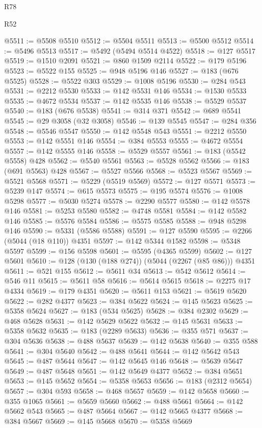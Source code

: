 \begin{lexlean}{R78}
\begin{lexlean}{R52}
\begin{coremodule}
{{{{{{{{{{{{{{{{{{{{{{{{{{{{{{{{{{{{{{{{{{{{{{{{{{{{{{{{{{{{{{{{{{{{{{{{{{{{{{{{{{{{{{{{{{{{{{{{{{{{{{{{{{{{{{{{{{{{{{{{{{{{{{{{{{{{{{{{{{{{{{{{{{{{{{{{{{{{{{{{{{{{{{{{{{{{{{{{{{{{{{{{{{{{{{{{{{{{{{@5511 := @5508 @5510
@5512 := @5504 @5511
@5513 := @5500 @5512
@5514 := @5496 @5513
@5517 := @5492 (@5494 @5514 @4522)
@5518 := @127 @5517
@5519 := @1510 @2091
@5521 := @860 @1509 @2114
@5522 := @179 @5196
@5523 := @5522 @155
@5525 := @948 @5196 @146
@5527 := @183 (@676 @5525)
@5528 := @5522 @303
@5529 := @1008 @5196
@5530 := @284 @543
@5531 := @2212 @5530
@5533 := @142 @5531 @146
@5534 := @1530 @5533
@5535 := @4672 @5534
@5537 := @142 @5535 @146
@5538 := @5529 @5537
@5540 := @183 (@676 @5538)
@5541 := @314 @371
@5542 := @689 @5541
@5545 := @29 @3058 (@32 @3058)
@5546 := @139 @5545
@5547 := @284 @356
@5548 := @5546 @5547
@5550 := @142 @5548 @543
@5551 := @2212 @5550
@5553 := @142 @5551 @146
@5554 := @384 @5553
@5555 := @4672 @5554
@5557 := @142 @5555 @146
@5558 := @5529 @5557
@5561 := @183 (@5542 @5558) @428
@5562 := @5540 @5561
@5563 := @5528 @5562
@5566 := @183 (@691 @5563) @428
@5567 := @5527 @5566
@5568 := @5523 @5567
@5569 := @5521 @5568
@5571 := @5229 (@5519 @5569)
@5572 := @127 @5571
@5573 := @5239 @147
@5574 := @615 @5573
@5575 := @195 @5574
@5576 := @1008 @5298
@5577 := @5030 @5274
@5578 := @2290 @5577
@5580 := @142 @5578 @146
@5581 := @5253 @5580
@5582 := @4748 @5581
@5584 := @142 @5582 @146
@5585 := @5576 @5584
@5586 := @5575 @5585
@5588 := @948 @5298 @146
@5590 := @5331 (@5586 @5588)
@5591 := @127 @5590
@5595 := @2266 (@5044 (@18 @110)) @4351
@5597 := @142 @5344 @1582
@5598 := @5348 @5597
@5599 := @156 @5598
@5601 := @5595 (@4365 @5599)
@5602 := @127 @5601
@5610 := @128 (@130 (@188 @274)) (@5044 (@2267 (@85 @86))) @4351
@5611 := @521 @155
@5612 := @5611 @34
@5613 := @542 @5612
@5614 := @546 @11
@5615 := @5611 @58
@5616 := @5614 @5615
@5618 := @2275 @17 @4334
@5619 := @179 @4351
@5620 := @5611 @153
@5621 := @5619 @5620
@5622 := @282 @4377
@5623 := @384 @5622
@5624 := @145 @5623
@5625 := @5358 @5624
@5627 := @183 (@534 @5625)
@5628 := @384 @2302
@5629 := @468 @5628
@5631 := @142 @5629 @5622
@5632 := @145 @5631
@5633 := @5358 @5632
@5635 := @183 (@2289 @5633)
@5636 := @355 @571
@5637 := @304 @5636
@5638 := @488 @5637
@5639 := @142 @5638
@5640 := @355 @588
@5641 := @304 @5640
@5642 := @488 @5641
@5644 := @142 @5642 @543
@5645 := @487 @5644
@5647 := @142 @5645 @146
@5648 := @5639 @5647
@5649 := @487 @5648
@5651 := @142 @5649 @4377
@5652 := @384 @5651
@5653 := @145 @5652
@5654 := @5358 @5653
@5656 := @183 (@2312 @5654)
@5657 := @304 @593
@5658 := @468 @5657
@5659 := @142 @5658
@5660 := @355 @1065
@5661 := @5659 @5660
@5662 := @488 @5661
@5664 := @142 @5662 @543
@5665 := @487 @5664
@5667 := @142 @5665 @4377
@5668 := @384 @5667
@5669 := @145 @5668
@5670 := @5358 @5669
}}}}}}}}}}}}}}}}}}}}}}}}}}}}}}}}}}}}}}}}}}}}}}}}}}}}}}}}}}}}}}}}}}}}}}}}}}}}}}}}}}}}}}}}}}}}}}}}}}}}}}}}}}}}}}}}}}}}}}}}}}}}}}}}}}}}}}}}}}}}}}}}}}}}}}}}}}}}}}}}}}}}}}}}}}}}}}}}}}}}}}}}}}}}}}}}}}}}}}
\end{coremodule}
\end{lexlean}
\end{lexlean}
